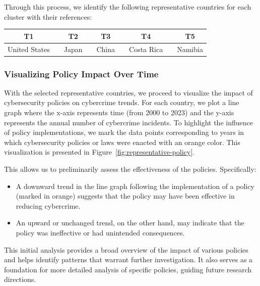         Through this process, we identify the following representative countries for each cluster with their references:
        \bigskip
        \begin{center}
            \begin{tabular}{ccccccccc}
                \hline
                \textbf{T1} &  & \textbf{T2} &  & \textbf{T3} &  & \textbf{T4} &  & \textbf{T5} \\
                \hline
                United States &  & Japan &  & China &  & Costa Rica &  & Namibia \\
            \end{tabular}
        \end{center}

    \subsubsection*{Visualizing Policy Impact Over Time} %
        With the selected representative countries,
        we proceed to visualize the impact of cybersecurity policies on cybercrime trends.
        For each country, we plot a line graph where
        the x-axis represents time (from 2000 to 2023) and the y-axis represents the annual number of cybercrime incidents.
        To highlight the influence of policy implementations,
        we mark the data points corresponding to years in which cybersecurity policies or laws were enacted with an orange color.
        This visualization is presented in Figure~\ref{fig:representative-policy}.
    
        This allows us to preliminarily assess the effectiveness of the policies.
        Specifically:
        \begin{itemize}
            \item A downward trend in the line graph following the implementation of a policy (marked in orange)
            suggests that the policy may have been effective in reducing cybercrime.
            \item An upward or unchanged trend, on the other hand,
            may indicate that the policy was ineffective or had unintended consequences.
        \end{itemize}
    
        This initial analysis provides a broad overview of the impact of various policies and
        helps identify patterns that warrant further investigation.
        It also serves as a foundation for more detailed analysis of specific policies, guiding future research directions.
    
